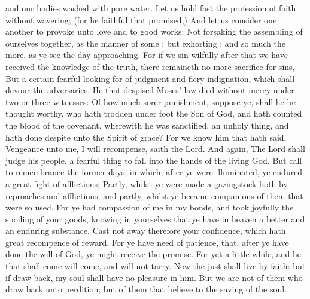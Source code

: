 {and our
bodies
washed
with
pure
water.
Let us hold
fast the
profession
of
{}
faith without
wavering; (for
he
{}
faithful that
promised;)
And let us
consider one
another
to
provoke unto
love
and
to
good
works:
Not
forsaking the
assembling of
ourselves
together,
as the
manner of
some
{};
but
exhorting
{}:
and so
much the
more,
as ye
see the
day
approaching.
For
if
we
sin
wilfully
after that we have
received the
knowledge of the
truth, there
remaineth no
more
sacrifice
for
sins,
But a
certain
fearful looking
for of
judgment
and
fiery
indignation,
which
shall
devour the
adversaries.
He
that
despised
Moses’
law
died
without
mercy
under
two
or
three
witnesses:
Of how
much
sorer
punishment, suppose
ye, shall he be thought
worthy, who hath trodden under
foot the
Son of
God,
and hath
counted the
blood of the
covenant,
wherewith he was
sanctified, an unholy
thing,
and hath done despite
unto the
Spirit of
grace?
For we
know him that hath
said,
Vengeance
{} unto
me,
I will
recompense,
saith the
Lord.
And
again, The
Lord shall
judge
his
people.
 a fearful
thing to
fall
into the
hands of
the
living
God.
But call to
remembrance
the
former
days,
in
which, after ye were
illuminated, ye
endured
a
great
fight of
afflictions;
Partly, whilst ye were made a
gazingstock
both by
reproaches
and
afflictions;
and
partly, whilst ye
became
companions of them that
were
so
used.
For ye had
compassion of
me in my
bonds,
and
took
joyfully the
spoiling
of
your
goods,
knowing
in
yourselves that ye
have
in
heaven
a
better
and an
enduring
substance.
Cast
not
away
therefore
your
confidence,
which
hath
great recompence of
reward.
For ye
have
need of
patience,
that, after ye have
done the
will of
God, ye might
receive the
promise.
For
yet a
little
while, and he that shall
come will
come,
and
will
not
tarry.
Now the
just shall
live
by
faith:
but
if
{} draw
back,
my
soul shall
have
no
pleasure
in
him.
But
we
are
not of them who draw
back
unto
perdition;
but of them that
believe
to the
saving of the
soul.

}
